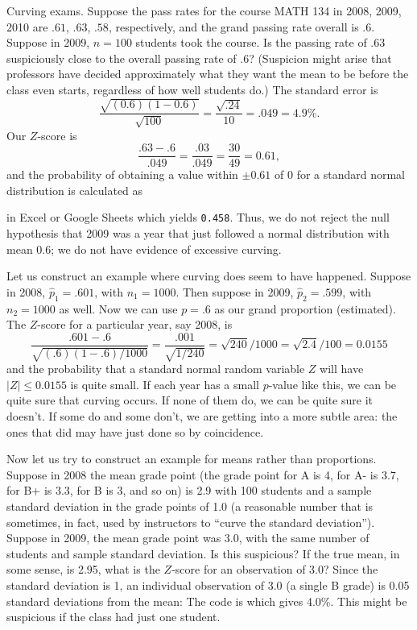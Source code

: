 \begin{example}{Curving exams.}\label{suspicious}
Suppose the pass rates for the course MATH 134 in 2008, 2009, 2010 are $.61$, $.63$, $.58$, respectively, and the grand passing rate overall is $.6$.
Suppose in 2009, $n=100$ students took the course. Is the passing rate of $.63$ suspiciously close to the overall passing rate of $.6$?
(Suspicion might arise that professors have decided approximately what they want the mean to be before the class even starts, regardless of how well students do.)
The standard error is
\[
	\frac{\sqrt{(0.6)(1-0.6)}}{\sqrt{100}} = \frac{\sqrt{.24}}{10} = .049 = 4.9\%.
\]
Our $Z$-score is
\[
	\frac{.63-.6}{.049} = \frac{.03}{.049} = \frac{30}{49}=0.61,
\]
and the probability of obtaining a value within $\pm 0.61$ of 0 for a standard normal distribution is calculated as


in Excel or Google Sheets which yields \texttt{0.458}. Thus, we do not reject the null hypothesis that 2009 was a year that just followed a normal distribution with mean 0.6; we do not have evidence of excessive curving.

Let us construct an example where curving does seem to have happened. Suppose in 2008, $\hat p_1=.601$, with $n_1=1000$.
Then suppose in 2009, $\hat p_2=.599$, with $n_2=1000$ as well.
Now we can use $p=.6$ as our grand proportion (estimated). The $Z$-score for a particular year, say 2008, is
\[
	\frac{.601-.6}{\sqrt{(.6)(1-.6)/1000}} = \frac{.001}{\sqrt{1/240}} = \sqrt{240}/1000 = \sqrt{2.4}/100 = 0.0155
\]
and the probability that a standard normal random variable $Z$ will have $|Z|\le 0.0155$ is quite small.
If each year has a small $p$-value like this, we can be quite sure that curving occurs.
If none of them do, we can be quite sure it doesn't.
If some do and some don't, we are getting into a more subtle area: the ones that did may have just done so by coincidence.


Now let us try to construct an example for means rather than proportions.
Suppose in 2008 the mean grade point (the grade point for A is 4, for A- is 3.7, for B+ is 3.3, for B is 3, and so on) is 2.9 with 100 students and a sample standard deviation in the grade points of 1.0 (a reasonable number that is sometimes, in fact, used by instructors to ``curve the standard deviation'').
Suppose in 2009, the mean grade point was 3.0, with the same number of students and sample standard deviation.
Is this suspicious?
If the true mean, in some sense, is 2.95, what is the $Z$-score for an observation of 3.0?
Since the standard deviation is 1, an individual observation of 3.0 (a single B grade) is 0.05 standard deviations from the mean:
The code is
which gives 4.0\%. This might be suspicious if the class had just one student.


\end{example}
